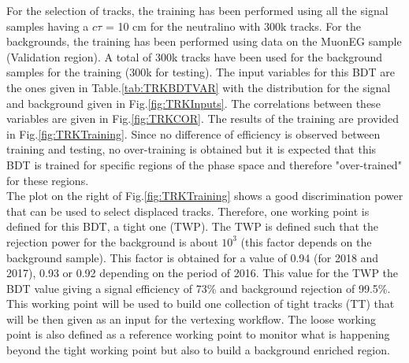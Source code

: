 \documentclass{cernatlasnote}
\begin{document}
\begin{appendices}
 For the selection of tracks, the training has been performed using all the signal samples having a $c\tau$ = 10 cm for the neutralino with 300k tracks. For the backgrounds, the training has been performed using data on the MuonEG sample (Validation region). A total of 300k tracks have been used for the background samples for the training (300k for testing). 
 The input variables for this BDT are the ones given in Table.\ref{tab:TRKBDTVAR} with the distribution for the signal and background given in Fig.\ref{fig:TRKInputs}. The correlations between these variables are given in Fig.\ref{fig:TRKCOR}. The results of the training are provided in Fig.\ref{fig:TRKTraining}. Since no difference of efficiency is observed between training and testing, no over-training is obtained but it is expected that this BDT is trained for specific regions of the phase space and therefore "over-trained" for these regions. \\
 The plot on the right of Fig.\ref{fig:TRKTraining} shows a good discrimination power that can be used to select displaced tracks. Therefore, one working point is defined for this BDT, a tight one (TWP). The TWP is defined such that the rejection power for the background is about $10^3$ (this factor depends on the background sample). This factor is obtained for a value of 0.94 (for 2018 and 2017), 0.93 or 0.92 depending on the period of 2016. This value for the TWP the BDT value giving a signal efficiency of 73\% and background rejection of 99.5\%. This working point will be used to build one collection of tight tracks (TT) that will be then given as an input for the vertexing workflow. The loose working point is also defined as a reference working point to monitor what is happening beyond the tight working point but also to build a background enriched region.


\end{appendices}
\end{document}
